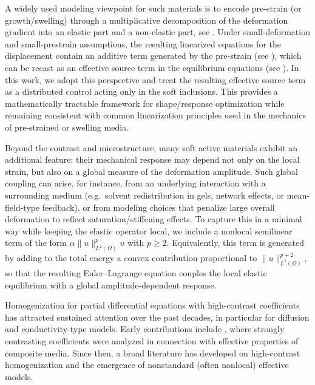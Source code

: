 \documentclass[11pt,a4paper]{article}
\numberwithin{equation}{section}
\begin{document}
A widely used modeling viewpoint for such materials is to encode pre-strain (or growth/swelling) through a
multiplicative decomposition of the deformation gradient into an elastic part and a non-elastic part, see \cite{prestrain02}.
Under small-deformation and small-prestrain assumptions, the resulting linearized equations for the
displacement contain an additive term generated by the pre-strain (see \cite{Amartya}), which can be recast as an effective
source term in the equilibrium equations (see \cite{GOW2}). In this work, we adopt this perspective and treat the resulting
effective source term as a distributed control acting only in the soft inclusions. This provides a
mathematically tractable framework for shape/response optimization while remaining consistent with common
linearization principles used in the mechanics of pre-strained or swelling media.

Beyond the contrast and microstructure, many soft active materials exhibit an additional feature: their
mechanical response may depend not only on the local strain, but also on a global measure of the
deformation amplitude. Such global coupling can arise, for instance, from an underlying interaction with a
surrounding medium (e.g.\ solvent redistribution in gels, network effects, or mean-field-type feedback),
or from modeling choices that penalize large overall deformation to reflect saturation/stiffening effects.
To capture this in a minimal way while keeping the elastic operator local, we include a nonlocal semilinear term of the form $\alpha\|u\|_{L^2(\Omega)}^p u$ with $p\geq 2$. Equivalently, this term is generated by adding
to the total energy a convex contribution proportional to $\|u\|_{L^2(\Omega)}^{p+2}$, so that the resulting
Euler--Lagrange equation couples the local elastic equilibrium with a global amplitude-dependent response.

Homogenization for partial differential equations with high-contrast coefficients has attracted sustained attention over the past decades, in particular for diffusion and conductivity-type models. Early contributions include \cite{MR620783,MR926151}, where strongly contrasting coefficients were analyzed in connection with effective properties of composite media. Since then, a broad literature has developed on high-contrast homogenization and the emergence of nonstandard (often nonlocal) effective models.
\end{document}
